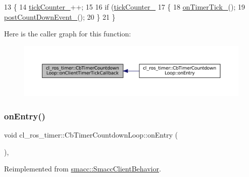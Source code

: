 \begin{DoxyCode}
13 \{
14     \hyperlink{classcl__ros__timer_1_1CbTimerCountdownLoop_a2b2d192bae0da3d26c6e3011583f9a6a}{tickCounter\_}++;
15 
16     \textcolor{keywordflow}{if} (\hyperlink{classcl__ros__timer_1_1CbTimerCountdownLoop_a2b2d192bae0da3d26c6e3011583f9a6a}{tickCounter\_} %
17     \{
18         \hyperlink{classcl__ros__timer_1_1CbTimerCountdownLoop_a9df6547f8ddf45107d8850d8a1a92cf4}{onTimerTick\_}();
19         \hyperlink{classcl__ros__timer_1_1CbTimerCountdownLoop_aafc2594c2923e4a355394ffb339d1800}{postCountDownEvent\_}();
20     \}
21 \}
\end{DoxyCode}
Here is the caller graph for this function\+:
\nopagebreak
\begin{figure}[H]
\begin{center}
\leavevmode
\includegraphics[width=350pt]{classcl__ros__timer_1_1CbTimerCountdownLoop_acb16f3448ad5955bf36e7c2cfd9f691c_icgraph}
\end{center}
\end{figure}
\mbox{\label{classcl__ros__timer_1_1CbTimerCountdownLoop_aa088f15db4fb2c307c86b30b2e1f7744}} 
\subsubsection{\texorpdfstring{on\+Entry()}{onEntry()}}
{\footnotesize\ttfamily void cl\+\_\+ros\+\_\+timer\+::\+Cb\+Timer\+Countdown\+Loop\+::on\+Entry (\begin{DoxyParamCaption}{ }\end{DoxyParamCaption})\hspace{0.3cm}{\ttfamily [override]}, {\ttfamily [virtual]}}



Reimplemented from \hyperlink{classsmacc_1_1SmaccClientBehavior_ad5d3e1f1697c3cfe66c94cadba948493}{smacc\+::\+Smacc\+Client\+Behavior}.



